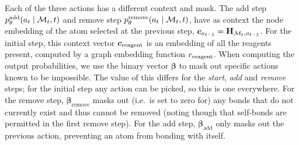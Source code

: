 Each of the three actions has a different context and mask.
The add step $p_\theta^\textrm{add}(a_t \mid {\mathcal{M}}_t, t)$ and remove step $p_\theta^\textrm{remove}(a_t \mid {\mathcal{M}}_t, t)$,
 have as context the node embedding of the atom selected at the previous step, $\bm{c}_{a_{t-1}} = {\mathbf{H}}_{{\mathcal{M}}_t, a_{t-1}}$. 
For the initial step, this context vector $\bm{c}_\mathrm{reagent}$ is an embedding of all the reagents present, computed %
by a graph embedding function $r_\mathrm{reagent}$.
When computing the output probabilities,
we use the binary vector $\bm{\beta}$ to mask out specific actions known to be impossible.
The value of this differs for the {\em start}, {\em add} and {\em remove} steps;
for the initial step any action can be picked, so this is one everywhere.
For the remove step, $\bm{\beta}_\mathrm{remove}$ masks out (i.e.\ is set to zero for) any bonds that do not currently exist and thus cannot be removed (noting though that self-bonds are permitted in the first remove step).
For the add step, $\bm{\beta}_\textrm{add}$ only masks out the previous action, preventing an atom from bonding with itself.


